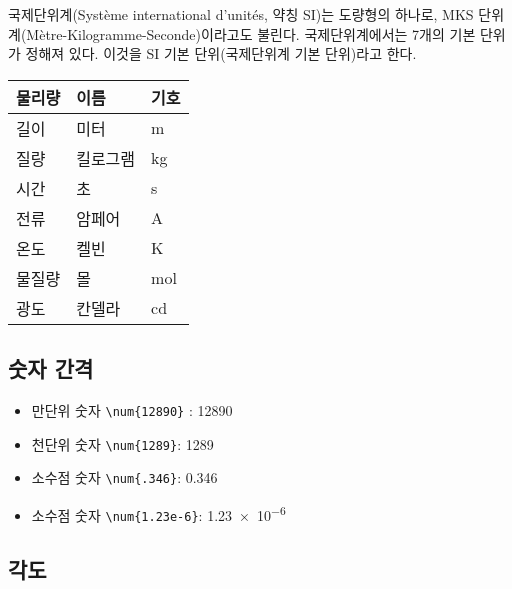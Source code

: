 
국제단위계(Système international d’unités, 약칭 SI)는 도량형의 하나로, MKS 단위계(Mètre-Kilogramme-Seconde)이라고도 불린다. 국제단위계에서는 7개의 기본 단위가 정해져 있다. 이것을 SI 기본 단위(국제단위계 기본 단위)라고 한다.

\begin{table}[h]
	\begin{tabular}{@{}lll@{}}
		\toprule
		물리량                       & 이름                        & 기호                       \\ \midrule
		\multicolumn{1}{|l|}{길이}  & \multicolumn{1}{l|}{미터}   & \multicolumn{1}{l|}{m}   \\ \midrule
		\multicolumn{1}{|l|}{질량}  & \multicolumn{1}{l|}{킬로그램} & \multicolumn{1}{l|}{kg}  \\ \midrule
		\multicolumn{1}{|l|}{시간}  & \multicolumn{1}{l|}{초}    & \multicolumn{1}{l|}{s}   \\ \midrule
		\multicolumn{1}{|l|}{전류}  & \multicolumn{1}{l|}{암페어}  & \multicolumn{1}{l|}{A}   \\ \midrule
		\multicolumn{1}{|l|}{온도}  & \multicolumn{1}{l|}{켈빈}   & \multicolumn{1}{l|}{K}   \\ \midrule
		\multicolumn{1}{|l|}{물질량} & \multicolumn{1}{l|}{몰}    & \multicolumn{1}{l|}{mol} \\ \midrule
		\multicolumn{1}{|l|}{광도} & \multicolumn{1}{l|}{칸델라}    & \multicolumn{1}{l|}{cd} \\ \bottomrule
	\end{tabular}
\end{table}

\subsection{숫자 간격}

\begin{itemize}
	\item 만단위 숫자 \verb*|\num{12890}| : \num{12890}
	\item 천단위 숫자 \verb*|\num{1289}|: \num{1289}
	\item 소수점 숫자 \verb*|\num{.346}|: \num{.346}
	\item 소수점 숫자 \verb*|\num{1.23e-6}|: \num{1.23e-6}
\end{itemize}


\subsection{각도}

